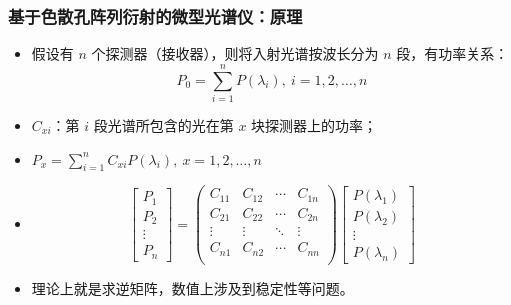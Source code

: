 \begin{frame}[c]
    \frametitle{基于色散孔阵列衍射的微型光谱仪：原理}
    \begin{itemize}
        \item 假设有 $n$ 个探测器（接收器），则将入射光谱按波长分为 $n$ 段，有功率关系：\[P_0=\sum^{n}_{i=1}P(\lambda_i),\ i=1,2,\dots,n\]
        \item $C_{xi}$：第 $i$ 段光谱所包含的光在第 $x$ 块探测器上的功率；
        \item $P_x=\sum^{n}_{i=1}C_{xi}P(\lambda_i),\ x=1,2,\dots,n$
        \item \[\begin{bmatrix}
                      P_1 \\P_2\\ \vdots \\ P_n
                  \end{bmatrix}=\begin{pmatrix}
                      C_{11} & C_{12} & \cdots & C_{1n} \\
                      C_{21} & C_{22} & \cdots & C_{2n} \\
                      \vdots & \vdots & \ddots & \vdots \\
                      C_{n1} & C_{n2} & \cdots & C_{nn} \\
                  \end{pmatrix}\begin{bmatrix}
                      P(\lambda_1) \\P(\lambda_2)\\ \vdots \\ P(\lambda_n)
                  \end{bmatrix}\]
        \item 理论上就是求逆矩阵，数值上涉及到稳定性等问题。
    \end{itemize}
\end{frame}


